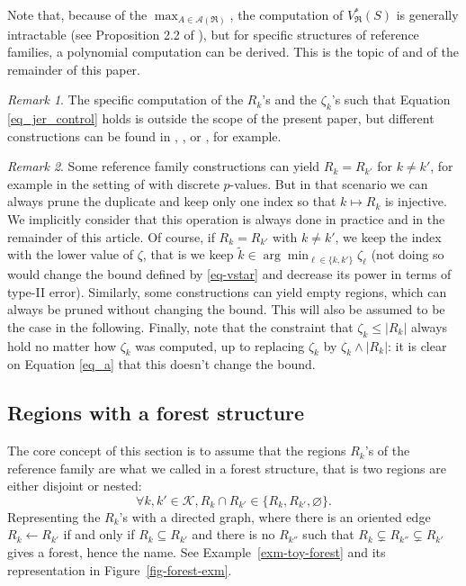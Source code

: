 \documentclass[
  11pt,
  a4paper,
]{article}
\theoremstyle{plain}
\theoremstyle{definition}
\theoremstyle{plain}
\theoremstyle{definition}
\theoremstyle{plain}
\theoremstyle{remark}
\newtheorem{refremark}{Remark}[section]
\begin{document}
Note that, because of the \(\max_{A\in\mathcal A(\mathfrak{R})}\), the
computation of \(V^*_{\mathfrak{R}}(S)\) is generally intractable (see
Proposition 2.2 of \citet{MR4124323}), but for specific structures of
reference families, a polynomial computation can be derived. This is the
topic of \citet{MR4178188} and of the remainder of this paper.

\begin{refremark}
The specific computation of the \(R_k\)'s and the \(\zeta_k\)'s such
that Equation \eqref{eq_jer_control} holds is outside the scope of the
present paper, but different constructions can be found in
\citet{MR4124323}, \citet{MR4178188}, \citet{blain22notip} or
\citet{JMLR:v25:23-1025}, for example.

\label{rem-zeta}

\end{refremark}

\begin{refremark}
Some reference family constructions can yield \(R_k=R_{k'}\) for
\(k\neq k'\), for example in the setting of \citet{JMLR:v25:23-1025}
with discrete \(p\)-values. But in that scenario we can always prune the
duplicate and keep only one index so that \(k\mapsto R_k\) is injective.
We implicitly consider that this operation is always done in practice
and in the remainder of this article. Of course, if \(R_k=R_{k'}\) with
\(k\neq k'\), we keep the index with the lower value of \(\zeta\), that
is we keep \(\tilde k\in\arg\min_{\ell\in\{k,k'\}}\zeta_{\ell}\) (not
doing so would change the bound defined by \eqref{eq-vstar} and decrease
its power in terms of type-II error). Similarly, some constructions can
yield empty regions, which can always be pruned without changing the
bound. This will also be assumed to be the case in the following.
Finally, note that the constraint that \(\zeta_k\leq |R_k|\) always hold
no matter how \(\zeta_k\) was computed, up to replacing \(\zeta_k\) by
\(\zeta_k\wedge |R_k|\): it is clear on Equation \eqref{eq_a} that this
doesn't change the bound.

\label{rem-distinct}

\end{refremark}

\subsection{Regions with a forest structure}\label{sec-forest-structure}

The core concept of this section is to assume that the regions \(R_k\)'s
of the reference family are what we called in \citet{MR4178188} a forest
structure, that is two regions are either disjoint or nested:
\begin{equation}
\forall k,k'\in\mathcal{K} , R_k \cap R_{k'} \in \{ R_k,  R_{k'} , \varnothing \}.
\label{eq-forest}
\end{equation} Representing the \(R_k\)'s with a directed graph, where
there is an oriented edge \(R_k \leftarrow R_{k'}\) if and only if
\(R_k \subseteq R_{k'}\) and there is no \(R_{k''}\) such that
\(R_k \subsetneq R_{k''}\subsetneq R_{k'}\) gives a forest, hence the
name. See Example~\ref{exm-toy-forest} and its representation in
Figure~\ref{fig-forest-exm}.
\end{document}
